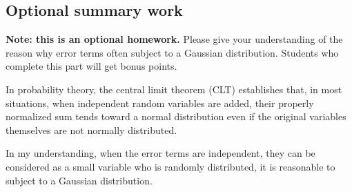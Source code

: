 \documentclass{article}
\newenvironment{answer}{\par\color{ForestGreen}}{\par}
\begin{document}
\subsection{Optional summary work}
\textbf{Note: this is an optional homework.} Please give your understanding of the reason
why error terms often subject to a Gaussian distribution. Students who complete this part
will get bonus points.

\begin{answer}
    In probability theory, the central limit theorem (CLT) establishes that, in most situations, when independent random variables are added, their properly normalized sum tends toward a normal distribution even if the original variables themselves are not normally distributed.

    In my understanding, when the error terms are independent, they can be considered as a small variable who is randomly distributed, it is reasonable to subject to a Gaussian distribution.
\end{answer}
\end{document}
